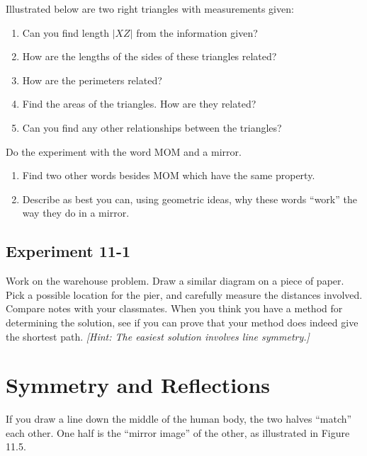 \documentclass[12pt]{book} %
\begin{document}
\begin{ExerciseList}
\setcounter{Exercise}{0}
\begin{ExerciseList}
\Exercise Illustrated below are two right triangles with measurements given:


\begin{enumerate}
\item[(a)] Can you find length $|XZ|$ from the information given?
\item[(b)] How are the lengths of the sides of these triangles related?
\item[(c)] How are the perimeters related?
\item[(d)] Find the areas of the triangles. How are they related?
\item[(e)] Can you find any other relationships between the triangles?
\end{enumerate}

\Exercise Do the experiment with the word MOM and a mirror.
\begin{enumerate}
\item[(a)] Find two other words besides MOM which have the same property.
\item[(b)] Describe as best you can, using geometric ideas, why these words ``work'' the way they do in a mirror.
\end{enumerate}
\end{ExerciseList}

\subsection*{Experiment 11-1}

Work on the warehouse problem. Draw a similar diagram on a piece of paper. Pick a possible location for the pier, and carefully measure the distances involved. Compare notes with your classmates. When you think you have a method for determining the solution, see if you can prove that your method does indeed give the shortest path. \textit{[Hint: The easiest solution involves line symmetry.]}

\section{Symmetry and Reflections}

If you draw a line down the middle of the human body, the two halves ``match'' each other. One half is the ``mirror image'' of the other, as illustrated in Figure 11.5.


\end{ExerciseList}
\end{document}
